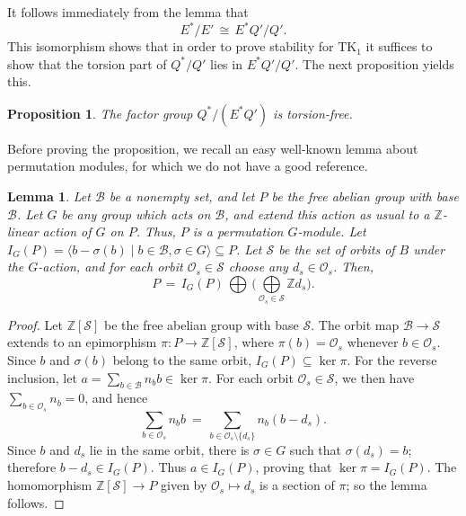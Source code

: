 \documentclass[11pt]{article}
\numberwithin{equation}{section}
\theoremstyle{plain}
\newtheorem{proposition}[theorem]{Proposition}
\newtheorem{lemma}[theorem]{Lemma}
\theoremstyle{remark}
\newcommand{\opn}{\operatorname}
\newcommand{\TK}{\opn{TK_1}}
\newcommand{\zz}{\mathbb Z}
\newcommand{\scB}{\mathcal B}
\newcommand{\scS}{\mathcal S}
\newcommand{\scO}{\mathcal O}
\begin{document}
It follows immediately from the lemma that 
\begin{equation}
\label{isoforTK_E}
E^*/E' \, \cong\, E^*Q'/Q'.
\end{equation} 
This isomorphism shows that in order to prove stability for $\TK$ it suffices to show that the torsion
part of $Q^* /Q'$ lies in $E^*Q'/Q'$.  The next proposition yields this.

\begin{proposition}
\label{prop:cokernel-torsion-free}
The factor group $Q^*/(E^*Q')$ is torsion-free.
\end{proposition}

Before proving the proposition, we recall an easy well-known lemma about permutation modules, for which we do not 
have a good reference.

\begin{lemma}
\label{lemma:permmod}
Let $\scB$ be a nonempty set, and let $P$ be the free abelian group with base $\scB$.  Let $G$ be any group which 
acts on $\scB$, and extend this action as usual to a $\zz$-linear action of $G$ on $P$.  Thus, $P$ is a permutation 
$G$-module.  Let 
$I_G(P) = \langle b - \sigma(b)\mid b\in \scB, \sigma \in G\rangle \subseteq P$.  Let $\scS$ be the set of orbits of $B$
 under the $G$-action, and for each orbit $\scO_s \in \scS$ choose any $d_s \in \scO_s$.  Then, 
$$
P \, = \,I_G(P) \,\textstyle{\bigoplus} \, \big(\underset{\scO_s \in \scS}\bigoplus \zz d_s\big).  
$$
\end{lemma} 

\begin{proof}
Let $\mathbb Z[\mathcal S]$ be the free abelian group with base $\mathcal S$. The orbit map $\mathcal B\to\mathcal S$ 
extends to an epimorphism $\pi\colon P\to\mathbb Z[\mathcal S]$, where $\pi(b)=\mathcal O_s$ whenever 
$b\in\mathcal O_s$. Since $b$ and $\sigma(b)$ belong to the same orbit, $I_G(P)\subseteq\ker\pi$. For the reverse 
inclusion, let $a=\sum_{b\in\mathcal B}n_b b\in\ker\pi$. For each orbit $\mathcal O_s\in\mathcal S$, we then have 
$\sum_{b\in\mathcal O_s}n_b=0$, and hence
$$
        \textstyle{\underset{b\in\mathcal O_s}\sum}n_b b
       \ =\,
        \textstyle{\underset{b\in\mathcal O_s\setminus\{d_s\}}\sum}
        n_b(b-d_s).
$$
Since $b$ and $d_s$ lie in the same orbit, there is $\sigma\in G$ such that $\sigma(d_s)=b$; therefore 
$b-d_s\in I_G(P)$. Thus $a\in I_G(P)$, proving that $\ker\pi=I_G(P)$. The homomorphism 
$\mathbb Z[\mathcal S]\to P$ given by $\mathcal O_s\mapsto d_s$ is a section of $\pi$; so the lemma follows.
\end{proof}
\end{document}

